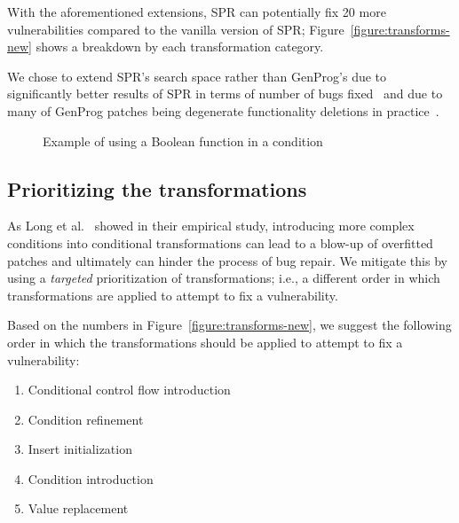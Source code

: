With the aforementioned extensions, SPR can potentially fix 20 more vulnerabilities compared to the vanilla version of SPR; Figure~\ref{figure:transforms-new} shows a breakdown by each transformation category.

We chose to extend SPR's search space rather than GenProg's due to significantly better results of SPR in terms of number of bugs fixed~\cite{long2015staged} and due to many of GenProg patches being degenerate functionality deletions in practice~\cite{qi2015analysis}.

\begin{figure}



\vspace{0.1in}
\small \caption{Example of using a Boolean function in a condition}
    \label{figure:new-ccfi}
\vspace{-0.2in}
\end{figure}

\subsection{Prioritizing the transformations}

As Long et al.~\cite{long2016analysis} showed in their empirical study, introducing more complex conditions into conditional transformations can lead to a blow-up of overfitted patches and ultimately can hinder the process of bug repair. We mitigate this by using a \emph{targeted} prioritization of transformations; i.e., a different order in which transformations are applied to attempt to fix a vulnerability.

Based on the numbers in Figure~\ref{figure:transforms-new}, we suggest the following order in which the transformations should be applied to attempt to fix a vulnerability:
\begin{enumerate}
    \item Conditional control flow introduction
    \item Condition refinement
    \item Insert initialization
    \item Condition introduction
    \item Value replacement
\end{enumerate}
